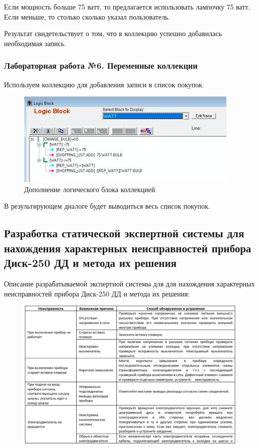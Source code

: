 \documentclass[14pt,a4paper,report]{report}
\begin{document}
Если мощность больше 75 ватт, то предлагается использовать лампочку 75 ватт. Если меньше, то столько сколько указал пользователь.


Результат свидетельствует о том, что в коллекцию успешно добавилась необходимая запись.

\subsubsection{Лабораторная работа №6. Переменные коллекции}

Используем коллекцию для добавления записи в список покупок. 

\begin{figure}[h!]
	\centering
	\includegraphics[scale = 1.1]{images/6_1.png}
	\caption{Дополнение логического блока коллекцией}
\end{figure}

В результирующем диалоге будет выводиться весь список покупок.


\subsection{Разработка статической экспертной системы для нахождения характерных неисправностей прибора Диск-250 ДД и метода их решения}

Описание разрабатываемой экспертной системы для для нахождения характерных неисправностей прибора Диск-250 ДД и метода их решения:

\begin{figure}[h!]
	\centering
	\includegraphics[scale = 0.65]{images/7_x1.png}
\end{figure}
\end{document}
